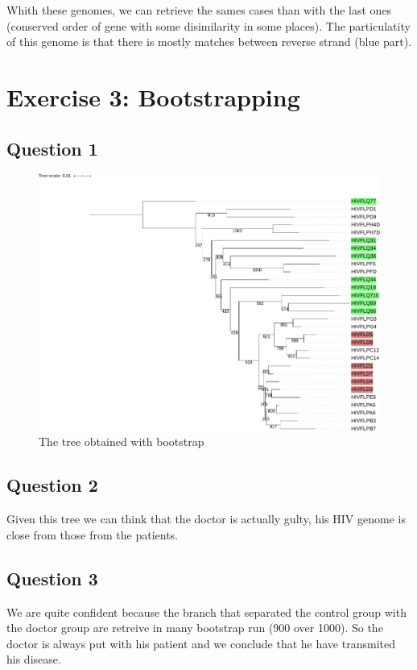 \documentclass[]{article}
\theoremstyle{definition}
\begin{document}
Whith these genomes, we can retrieve the sames cases than with the last ones (conserved order of gene with some disimilarity in some places). The particulatity of this genome is that there is mostly matches between reverse strand (blue part).

\section{Exercise 3: Bootstrapping}

\subsection{Question 1}

 \begin{figure}[H]
	\centering
	\includegraphics*[scale=0.45]{image/tree.pdf}
	\caption{ The tree obtained with bootstrap }
\end{figure}


\subsection{Question 2}

Given this tree we can think that the doctor is actually gulty, his HIV genome is close from those from the patients.

\subsection{Question 3}

We are quite confident because the branch that separated the control group with the doctor group are retreive in many bootstrap run (900 over 1000). So the doctor is always put with his patient and we conclude that he have transmited his disease.
\end{document}
